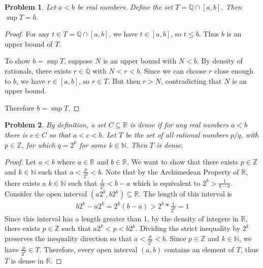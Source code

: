 \documentclass[12pt]{article}
\newtheorem{problem}{Problem}
\newcommand{\NN}{\ensuremath{\mathbb N}}
\newcommand{\QQ}{\ensuremath{\mathbb Q}}
\newcommand{\RR}{\ensuremath{\mathbb R}}
\newcommand{\ZZ}{\ensuremath{\mathbb Z}}
\begin{document}
\begin{problem} %
Let $a<b$ be real numbers.  Define the set $T=\QQ \cap [a,b]$.  Then $\sup T = b$.
\end{problem}


\begin{proof}
For any $t \in T = \mathbb{Q} \cap [a,b]$, we have $t \in [a,b]$, so $t \leq b$. Thus $b$ is an upper bound of $T$.

To show $b = \sup T$, suppose $N$ is an upper bound with $N < b$. By density of rationals, there exists $r \in \mathbb{Q}$ with $N < r < b$. Since we can choose $r$ close enough to $b$, we have $r \in [a,b]$, so $r \in T$. But then $r > N$, contradicting that $N$ is an upper bound.

Therefore $b = \sup T$.
\end{proof}


\begin{problem} %
By definition, a set $C\subseteq \RR$ is \emph{dense} if for any real numbers $a<b$ there is $c\in C$ so that $a<c<b$.  Let $T$ be the set of all rational numbers $p/q$, with $p\in\ZZ$, for which $q=2^k$ for some $k\in\NN$.  Then $T$ is dense.
\end{problem}


\begin{proof}
  Let $a < b$ where $a \in \RR$ and $b \in \RR$. We want to show that there exists $p \in \ZZ$ and $k \in \NN$ such that $a < \frac{p}{2^k} < b$. Note that by the Archimedean Property of $\RR$, there exists a $k \in \NN$ such that $\frac{1}{2^k} < b - a$ which is equivalent to $2^k > \frac{1}{b -a}$.
  Consider the open interval $(a2^k, b2^k) \subseteq \RR$. The length of this interval is
  \begin{align*}
    b2^k - a2^k =2^k(b - a) > 2^k * \frac{1}{2^k} = 1
  \end{align*}
  Since this interval has a length greater than 1, by the density of integers in $\RR$, there exists $p \in \ZZ$ such that $a2^k < p < b2^k$. Dividing the strict inequality by $2^k$ preserves the inequality direction so that $a < \frac{p}{2^k} < b$. Since $p \in \ZZ$ and $k \in \NN$, we have $\frac{p}{2^k} \in T$. Therefore, every open interval $(a, b)$ contains an element of $T$, thus $T$ is dense in $\RR$.
\end{proof}
\end{document}
